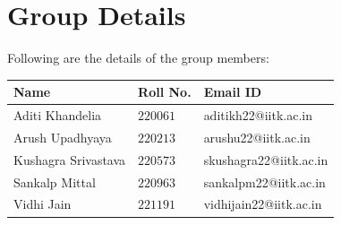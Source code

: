 \section*{Group Details}
Following are the details of the group members:

\begin{table}[H]
  \centering
  \begin{tabular}{lll}
    \toprule
    \textbf{Name} & \textbf{Roll No.} & \textbf{Email ID} \\
    \midrule
    Aditi Khandelia & $220061$ & aditikh22@iitk.ac.in \\
    Arush Upadhyaya & $220213$ & arushu22@iitk.ac.in \\
    Kushagra Srivastava & $220573$ & skushagra22@iitk.ac.in \\
    Sankalp Mittal & $220963$ & sankalpm22@iitk.ac.in \\
    Vidhi Jain & $221191$ & vidhijain22@iitk.ac.in \\
    \bottomrule
  \end{tabular}
  \label{tab:table1}
\end{table}


